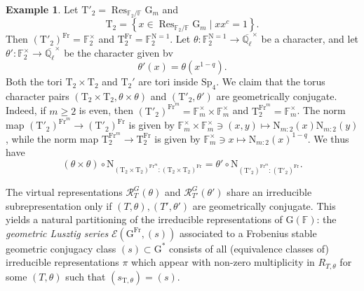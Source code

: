 \documentclass[12pt, reqno]{amsart}
\theoremstyle{definition}
\theoremstyle{definition}
\theoremstyle{definition}
\newtheorem{example}[theorem]{Example}
\newcommand{\multiplicativegroup}[1]{#1^{\times}}
\newcommand{\involution}[1]{#1^{c}}
\newcommand{\FieldNorm}[2]{\mathrm{N}_{#1:#2}}
\newcommand{\aFieldNorm}{\mathrm{N}}
\newcommand{\finiteField}{\mathbb{F}}
\newcommand{\finiteFieldExtension}[1]{\finiteField_{#1}}
\newcommand{\NormOneGroup}[1]{\finiteFieldExtension{#1}^{\aFieldNorm = 1}}
\newcommand{\algebraicClosure}[1]{\overline{#1}}
\newcommand{\Frobenius}{\operatorname{Fr}}
\newcommand{\restrictionOfScalars}[3]{\operatorname{Res}_{#1 \slash #2}{#3}}
\newcommand{\multiplcativeScheme}{\algebraicGroup{G}_m}
\newcommand{\ladicnumbers}{\algebraicClosure{\mathbb{Q}_{\ell}}}
\newcommand{\algebraicGroup}[1]{\boldsymbol{\mathrm{#1}}}
\newcommand{\LusztigSeries}[2]{\mathcal{E}\left(#1, (#2)\right)}
\newcommand{\RTTheta}[2]{R_{#1, #2}}
\newcommand{\RTThetaVirtual}[3]{\mathcal{R}_{#1}^{#2}(#3)}
\newcommand{\calvin}[1]{\textcolor{orange}{\sffamily ((CALVIN: #1))}}
\newcommand{\elad}[1]{\textcolor{blue}{\sffamily ((ELAD: #1))}}
\begin{document}
\begin{example}
	Let $\algebraicGroup{T}'_2 = \restrictionOfScalars{\finiteFieldExtension{2}}{\finiteField}{\multiplcativeScheme}$ and $$\algebraicGroup{T}_2 = \left\{x \in \restrictionOfScalars{\finiteFieldExtension{2}}{\finiteField}{\multiplcativeScheme} \mid x \involution{x} = 1 \right\}.$$
	Then $\left(\algebraicGroup{T}'_2\right)^{\Frobenius} = \multiplicativegroup{\finiteFieldExtension{2}}$ and $\algebraicGroup{T}_2^{\Frobenius} = \NormOneGroup{2}$. Let $\theta \colon \NormOneGroup{2} \to \multiplicativegroup{\ladicnumbers}$ be a character, and let $\theta' \colon \multiplicativegroup{\finiteFieldExtension{2}} \to \multiplicativegroup{\ladicnumbers}$ be the character given bv $$\theta'\left(x\right) = \theta\left(x^{1-q}\right).$$
	Both the tori $\algebraicGroup{T}_2 \times \algebraicGroup{T}_2$ and $\algebraicGroup{T}_2'$ are tori inside $\algebraicGroup{Sp}_4$.
	We claim that the torus character pairs $\left(\algebraicGroup{T}_2 \times \algebraicGroup{T}_2, \theta \times \theta\right)$ and $\left(\algebraicGroup{T}'_2, \theta'\right)$ are geometrically conjugate. Indeed, if $m \ge 2$ is even, then $\left(\algebraicGroup{T}'_2\right)^{\Frobenius^{m}} = \multiplicativegroup{\finiteFieldExtension{m}} \times \multiplicativegroup{\finiteFieldExtension{m}}$ and $\algebraicGroup{T}_2^{\Frobenius^m} = \multiplicativegroup{\finiteFieldExtension{m}}$. The norm map $\left(\algebraicGroup{T}'_2\right)^{\Frobenius^{m}} \to \left(\algebraicGroup{T}'_2\right)^{\Frobenius}$ is given by $\multiplicativegroup{\finiteFieldExtension{m}} \times \multiplicativegroup{\finiteFieldExtension{m}} \ni \left(x,y\right) \mapsto \FieldNorm{m}{2}\left(x\right) \FieldNorm{m}{2}\left(y\right)$, while the norm map $\algebraicGroup{T}_2^{\Frobenius^{m}} \to \algebraicGroup{T}_2^{\Frobenius}$ is given by $\multiplicativegroup{\finiteFieldExtension{m}} \ni x \mapsto \FieldNorm{m}{2}\left(x\right)^{1-q}$. We thus have
	$$\left(\theta \times \theta\right) \circ \aFieldNorm_{ \left(\algebraicGroup{T}_2 \times \algebraicGroup{T}_2\right)^{\Frobenius^m} : \left(\algebraicGroup{T}_2 \times \algebraicGroup{T}_2\right)^{\Frobenius} } = \theta' \circ \aFieldNorm_{\left(\algebraicGroup{T}'_2\right)^{\Frobenius^m} \colon \left(\algebraicGroup{T}'_2\right)^{\Frobenius}}.$$
\end{example}

The virtual representations $\RTThetaVirtual{T}{G}{\theta}$ and $\RTThetaVirtual{T'}{G}{\theta'}$ share an irreducible subrepresentation only if $(T,\theta),(T',\theta')$ are geometrically conjugate. This yields a natural partitioning of the irreducible representations of $\algebraicGroup{G}(\finiteField)$: the \emph{geometric Lusztig series} $\LusztigSeries{\algebraicGroup{G}^{\Frobenius}}{s}$ associated to a Frobenius stable geometric conjugacy class $(s) \subset \algebraicGroup{G}^*$ consists of all (equivalence classes of) irreducible representations $\pi$ which appear with non-zero multiplicity in $\RTTheta{T}{\theta}$ for some $(T,\theta)$ such that $(s_{\algebraicGroup{T},\theta}) = (s)$.
\end{document}
